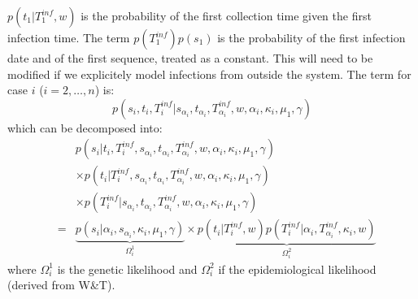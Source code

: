 \documentclass[10pt]{article}
\begin{document}
$p(t_1 | T_1^{inf},w)$ is the probability of the first collection time given the first infection time. 
The term $p(T_1^{inf}) p(s_1)$ is the probability of the first infection date and of the first sequence, treated as a constant.
This will need to be modified if we explicitely model infections from outside the system.
The term for case $i$ ($i=2,\ldots,n$) is:
\begin{equation}
 p(s_i, t_i, T_i^{inf}| s_{\alpha_i}, t_{\alpha_i}, T_{\alpha_i}^{inf},  w,  \alpha_i, \kappa_i, \mu_1, \gamma )
\end{equation}
which can be decomposed into:
\begin{eqnarray}
& & p(s_i | t_i, T_i^{inf}, s_{\alpha_i}, t_{\alpha_i}, T_{\alpha_i}^{inf},  w,  \alpha_i, \kappa_i, \mu_1, \gamma) \nonumber \\
& &  \times  p(t_i | T_i^{inf}, s_{\alpha_i}, t_{\alpha_i}, T_{\alpha_i}^{inf},  w,  \alpha_i, \kappa_i, \mu_1, \gamma) \nonumber \\
& & \times  p(T_i^{inf}| s_{\alpha_i}, t_{\alpha_i}, T_{\alpha_i}^{inf},  w,  \alpha_i, \kappa_i, \mu_1, \gamma) \nonumber \\
& = & 
\underbrace{p(s_i | \alpha_i, s_{\alpha_i}, \kappa_i, \mu_1, \gamma)}_{\Omega_i^1} 
  \times  \underbrace{p(t_i | T_i^{inf}, w) 
  p(T_i^{inf}| \alpha_i, T_{\alpha_i}^{inf}, \kappa_i, w)}_{\Omega_i^2}
\end{eqnarray}
\noindent where $\Omega_i^1$ is the genetic likelihood and $\Omega_i^2$ if the epidemiological likelihood (derived from W\&T).
\\
\end{document}
